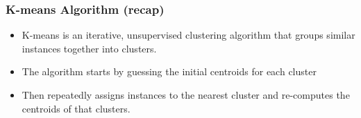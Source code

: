 \begin{frame}[fragile]\frametitle{K-means Algorithm (recap)}
\begin{itemize}
\item  K-means is an iterative, unsupervised clustering algorithm that groups similar instances together into clusters. 
\item The algorithm starts by guessing the initial centroids for each cluster
\item Then repeatedly assigns instances to the nearest cluster and re-computes the centroids of that clusters. 
\end{itemize}
\end{frame}


